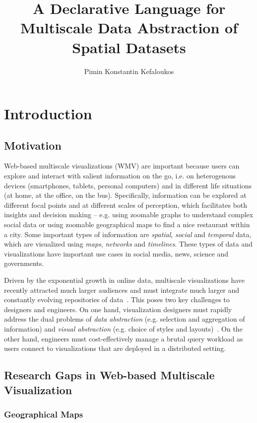 \documentclass[11pt, oneside]{report}   	%
\title{A Declarative Language for Multiscale Data Abstraction of Spatial Datasets}
\author{Pimin Konstantin Kefaloukos}
\begin{document}
\maketitle

\tableofcontents

\chapter{Introduction}

\section{Motivation}
Web-based multiscale visualizations (WMV) are important because users can explore and interact with salient information on the go, i.e. on heterogenous devices (smartphones, tablets, personal computers) and in different life situations (at home, at the office, on the bus).  Specifically, information can be explored at different focal points and at different scales of perception, which facilitates both insights and decision making -- e.g. using zoomable graphs to understand complex social data or using zoomable geographical maps to find a nice restaurant within a city. Some important types of information are \emph{spatial}, \emph{social} and \emph{temporal} data, which are visualized using \emph{maps}, \emph{networks} and \emph{timelines}. These types of data and visualizations have important use cases in social media, news, science and governments.

Driven by the exponential growth in online data, multiscale visualizations have recently attracted much larger audiences and must integrate much larger and constantly evolving repositories of data~\cite{gst, foo}. This poses two key challenges to designers and engineers. On one hand, visualization designers must rapidly address the dual problems of \emph{data abstraction} (e.g. selection and aggregation of information) and \emph{visual abstraction} (e.g. choice of styles and layouts)~\cite{stolte2003multiscale}. On the other hand, engineers must cost-effectively manage a brutal query workload as users connect to visualizations that are deployed in a distributed setting.

\section{Research Gaps in Web-based Multiscale Visualization}

\subsection{Geographical Maps}
\end{document}
